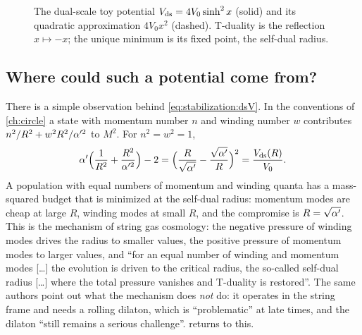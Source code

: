 \begin{figure}[t]
\centering
{}
\caption{The dual-scale toy potential $V_{\rm ds}=4V_0\sinh^2x$ (solid) and its quadratic
approximation $4V_0x^2$ (dashed). T-duality is the reflection $x\mapsto-x$; the unique minimum
is its fixed point, the self-dual radius.}\label{fig:stabilization:ds}
\end{figure}

\subsection{Where could such a potential come from?}

There is a simple observation behind \eqref{eq:stabilization:dsV}. In the conventions of
\cref{ch:circle} a state with momentum number $n$ and winding number $w$ contributes
$n^2/R^2+w^2R^2/\alpha'^2$ to $M^2$. For $n^2=w^2=1$,
\begin{equation}\label{eq:stabilization:gas}
 \alpha'\Bigl(\frac{1}{R^2}+\frac{R^2}{\alpha'^2}\Bigr)-2=\Bigl(\frac{R}{\sqrt{\alpha'}}-
 \frac{\sqrt{\alpha'}}{R}\Bigr)^2=\frac{V_{\rm ds}(R)}{V_0} .
\end{equation}
A population with equal numbers of momentum and winding quanta has a mass-squared budget that
is minimized at the self-dual radius: momentum modes are cheap at large $R$, winding modes at
small $R$, and the compromise is $R=\sqrt{\alpha'}$. This is the mechanism of string gas cosmology:
the negative pressure of winding modes drives the radius to smaller values, the positive
pressure of momentum modes to larger values, and ``for an equal number of winding and momentum
modes [\dots] the evolution is driven to the critical radius, the so-called self-dual radius
[\dots] where the total pressure vanishes and T-duality is restored''.
 \TL{} The same authors point out what the mechanism does
\emph{not} do: it operates in the string frame and needs a rolling dilaton, which is
``problematic'' at late times, and the dilaton ``still remains a serious challenge''.
  returns to this.

